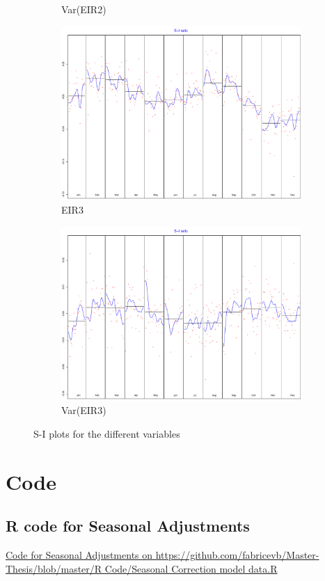 \documentclass[12pt,a4paper,oneside]{book}
\begin{document}
\begin{figure}
\begin{subfigure}{.5\textwidth}
  \caption{Var(EIR2)}
\end{subfigure}
\begin{subfigure}{.5\textwidth}
  \centering
  \includegraphics[width=.8\linewidth]{Graphs/S-I_7.pdf}
  \caption{EIR3}
\end{subfigure}
\begin{subfigure}{.5\textwidth}
  \centering
  \includegraphics[width=.8\linewidth]{Graphs/S-I_8.pdf}
  \caption{Var(EIR3)}
\end{subfigure}
\caption{S-I plots for the different variables}
\label{fig:S-I seasonal correction RJDemetra}
\end{figure}





\chapter*{Code}
\section*{R code for Seasonal Adjustments}
\href{https://github.com/fabricevb/Master-Thesis/blob/master/R Code/Seasonal Correction model data.R}{Code for Seasonal Adjustments on https://github.com/fabricevb/Master-Thesis/blob/master/R Code/Seasonal Correction model data.R}
\end{document}
